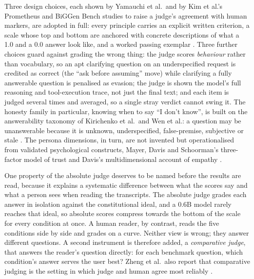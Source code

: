 Three design choices, each shown by Yamauchi et al.\ and by Kim et al.'s Prometheus and BiGGen Bench studies to raise a judge's agreement with human markers, are adopted in full: every principle carries an explicit written criterion, a scale whose top and bottom are anchored with concrete descriptions of what a 1.0 and a 0.0 answer look like, and a worked passing exemplar \cite{yamauchi2025empiricalstudyllmasajudgedesign, kim2024prometheusinducingfinegrainedevaluation}. Three further choices guard against grading the wrong thing: the judge scores \emph{behaviour} rather than vocabulary, so an apt clarifying question on an underspecified request is credited as correct (the ``ask before assuming'' move) while clarifying a fully answerable question is penalised as evasion; the judge is shown the model's full reasoning and tool-execution trace, not just the final text; and each item is judged several times and averaged, so a single stray verdict cannot swing it. The honesty family in particular, knowing when to say ``I don't know'', is built on the answerability taxonomy of Kirichenko et al.\ and Wen et al.: a question may be unanswerable because it is unknown, underspecified, false-premise, subjective or stale \cite{kirichenko2025abstentionbenchreasoningllmsfail, wen2025knowlimitssurveyabstention}. The persona dimensions, in turn, are not invented but operationalised from validated psychological constructs, Mayer, Davis and Schoorman's three-factor model of trust \cite{mayer1995integrativetrust} and Davis's multidimensional account of empathy \cite{davis1983empathyiri}.

One property of the absolute judge deserves to be named before the results are read, because it explains a systematic difference between what the scores say and what a person sees when reading the transcripts. The absolute judge grades each answer in isolation against the constitutional ideal, and a 0.6B model rarely reaches that ideal, so absolute scores compress towards the bottom of the scale for every condition at once. A human reader, by contrast, reads the five conditions side by side and grades on a curve. Neither view is wrong; they answer different questions. A second instrument is therefore added, a \emph{comparative judge}, that answers the reader's question directly: for each benchmark question, which condition's answer serves the user best? Zheng et al.\ also report that comparative judging is the setting in which judge and human agree most reliably \cite{zheng2023judgingllmasajudgemtbenchchatbot}.

